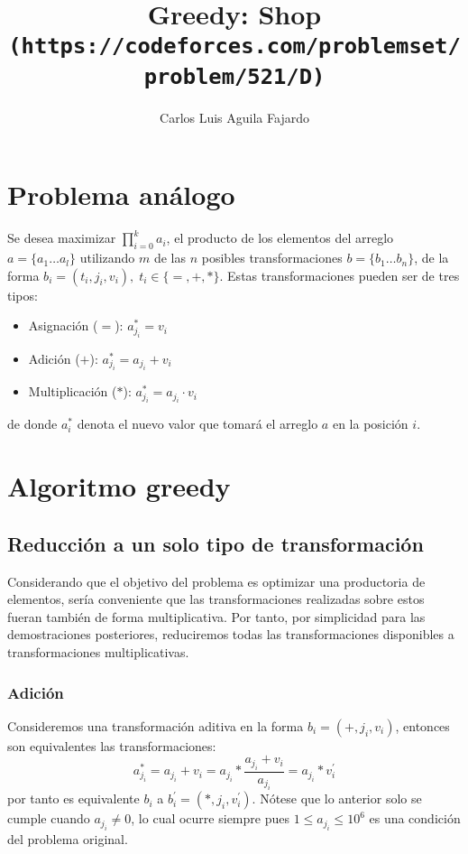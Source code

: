 \documentclass{article}
\title{
	   Greedy: Shop\\
	   \texttt{{\large (https://codeforces.com/problemset/problem/521/D)}}}
\author{Carlos Luis Aguila Fajardo}
\date{}
\theoremstyle{default}
\begin{document}
\maketitle

\section{Problema análogo}
	Se desea maximizar $\prod\limits_{i=0}^k{a_i}$, el producto de los elementos del arreglo $a = \{a_1 \dots a_l\}$ utilizando $m$ de las $n$ posibles transformaciones $b = \{b_1 \dots b_n\}$, de la forma $b_i = \left( t_i, j_i, v_i \right),\; t_i \in \{=, +, *\}$. Estas transformaciones pueden ser de tres tipos:
%
	\begin{itemize}
		\item Asignación ($=$): $a_{j_i}^* = v_i$
		\item Adición ($+$): $a_{j_i}^* = a_{j_i} + v_i$
		\item Multiplicación ($*$): $a_{j_i}^* = a_{j_i} \cdot v_i$
	\end{itemize}
%
	de donde $a_i^*$ denota el nuevo valor que tomará el arreglo $a$ en la posición $i$.
%
%
\newpage
%
%
\section{Algoritmo greedy}
\subsection{Reducción a un solo tipo de transformación}
	Considerando que el objetivo del problema es optimizar una productoria de elementos, sería conveniente que las transformaciones realizadas sobre estos fueran también de forma multiplicativa. Por tanto, por simplicidad para las demostraciones posteriores, reduciremos todas las transformaciones disponibles a transformaciones multiplicativas.
%
	\subsubsection{Adición}
		Consideremos una transformación aditiva en la forma $b_i = \left( +, j_i, v_i \right)$, entonces son equivalentes las transformaciones:
%
		\begin{equation}
			a_{j_i}^* = a_{j_i} + v_i = a_{j_i} * \dfrac{a_{j_i} + v_i}{a_{j_i}} = a_{j_i} * v_i^\prime
		\end{equation}
%
		por tanto es equivalente $b_i$ a $b_i^{\prime} = (*, j_i, v_i^\prime)$. Nótese que lo anterior solo se cumple cuando $a_{j_i} \neq 0$, lo cual ocurre siempre pues $1 \leq a_{j_i} \leq 10^6$ es una condición del problema original.
%
%
\end{document}
